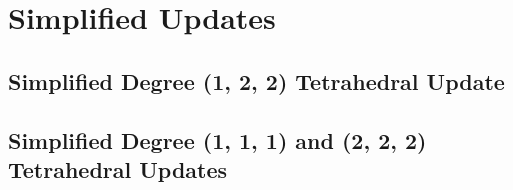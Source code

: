 \documentclass[eikonal.tex]{subfiles}
\begin{document}
\large

\section{Simplified Updates}

\subsection{Simplified Degree (1, 2, 2) Tetrahedral Update}

\subsection{Simplified Degree (1, 1, 1) and (2, 2, 2) Tetrahedral Updates}
\end{document}
